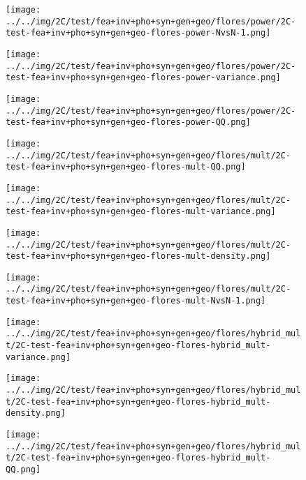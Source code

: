 \begin{figure}[H]
\centering	\texttt{[image: ../../img/2C/test/fea+inv+pho+syn+gen+geo/flores/power/2C-test-fea+inv+pho+syn+gen+geo-flores-power-NvsN-1.png]}
\end{figure}
\begin{figure}[H]
\centering	\texttt{[image: ../../img/2C/test/fea+inv+pho+syn+gen+geo/flores/power/2C-test-fea+inv+pho+syn+gen+geo-flores-power-variance.png]}
\end{figure}
\begin{figure}[H]
\centering	\texttt{[image: ../../img/2C/test/fea+inv+pho+syn+gen+geo/flores/power/2C-test-fea+inv+pho+syn+gen+geo-flores-power-QQ.png]}
\end{figure}
\begin{figure}[H]
\centering	\texttt{[image: ../../img/2C/test/fea+inv+pho+syn+gen+geo/flores/mult/2C-test-fea+inv+pho+syn+gen+geo-flores-mult-QQ.png]}
\end{figure}
\begin{figure}[H]
\centering	\texttt{[image: ../../img/2C/test/fea+inv+pho+syn+gen+geo/flores/mult/2C-test-fea+inv+pho+syn+gen+geo-flores-mult-variance.png]}
\end{figure}
\begin{figure}[H]
\centering	\texttt{[image: ../../img/2C/test/fea+inv+pho+syn+gen+geo/flores/mult/2C-test-fea+inv+pho+syn+gen+geo-flores-mult-density.png]}
\end{figure}
\begin{figure}[H]
\centering	\texttt{[image: ../../img/2C/test/fea+inv+pho+syn+gen+geo/flores/mult/2C-test-fea+inv+pho+syn+gen+geo-flores-mult-NvsN-1.png]}
\end{figure}
\begin{figure}[H]
\centering	\texttt{[image: ../../img/2C/test/fea+inv+pho+syn+gen+geo/flores/hybrid\_mult/2C-test-fea+inv+pho+syn+gen+geo-flores-hybrid\_mult-variance.png]}
\end{figure}
\begin{figure}[H]
\centering	\texttt{[image: ../../img/2C/test/fea+inv+pho+syn+gen+geo/flores/hybrid\_mult/2C-test-fea+inv+pho+syn+gen+geo-flores-hybrid\_mult-density.png]}
\end{figure}
\begin{figure}[H]
\centering	\texttt{[image: ../../img/2C/test/fea+inv+pho+syn+gen+geo/flores/hybrid\_mult/2C-test-fea+inv+pho+syn+gen+geo-flores-hybrid\_mult-QQ.png]}
\end{figure}
